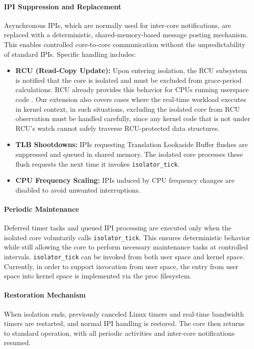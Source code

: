 \documentclass[letterpaper]{article}
\begin{document}
\paragraph{IPI Suppression and Replacement}  
Asynchronous IPIs, which are normally used for inter-core notifications, are replaced with a deterministic,
shared-memory-based message posting mechanism. This enables controlled core-to-core communication without
the unpredictability of standard IPIs. Specific handling includes:
\begin{itemize}
    \item \textbf{RCU (Read-Copy Update):}  Upon entering isolation, the RCU subsystem is notified that the core is isolated and must be excluded from grace-period calculations. RCU already provides this behavior for CPUs running userspace code \cite{weisbecker2012context}. Our extension also covers cases where the real-time workload executes in kernel context, in such situations, excluding the isolated core from RCU observation must be handled carefully, since any kernel code that is not under RCU's watch cannot safely traverse RCU-protected data structures. 

    \item \textbf{TLB Shootdowns:} IPIs requesting Translation Lookaside Buffer flushes are suppressed and queued in shared memory.
      The isolated core processes these flush requests the next time it invokes \texttt{isolator\_tick}.
    \item \textbf{CPU Frequency Scaling:} IPIs induced by CPU frequency changes are disabled to avoid unwanted interruptions.
\end{itemize}

\paragraph{Periodic Maintenance}  
Deferred timer tasks and queued IPI processing are executed only when the isolated core voluntarily calls \texttt{isolator\_tick}. This ensures deterministic behavior while still allowing the core to perform necessary maintenance tasks at controlled intervals. \texttt{isolator\_tick} can be invoked from both user space and kernel space. Currently, in order to support invocation from user space, the entry from user space into kernel space is implemented via the proc filesystem.

\paragraph{Restoration Mechanism}  
When isolation ends, previously canceled Linux timers and real-time bandwidth timers are restarted, and normal IPI handling is restored. The core then returns to standard operation, with all periodic activities and inter-core notifications resumed.
\end{document}
